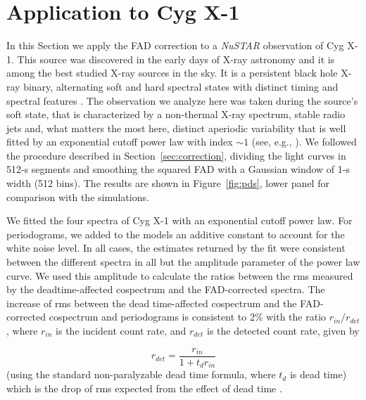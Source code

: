 \documentclass[twocolumn]{aastex61}
\newcommand{\project}[1]{\textsl{#1}}
\newcommand{\nustar}{\project{NuSTAR}\xspace}
\newcommand{\sref}{Section~\ref}
\newcommand{\deadt}{\ensuremath{t_d}\xspace}
\begin{document}
\section{Application to Cyg X-1}\label{sec:realdata}
In this Section we apply the FAD correction to a \nustar observation of Cyg X-1.
This source was discovered in the early days of X-ray astronomy \citep{Bowyer+65} and it is among the best studied X-ray sources in the sky.
It is a persistent black hole X-ray binary, alternating soft and hard spectral states with distinct timing and spectral features \citep[see, e.g., ][]{Grinberg+13}.
The observation we analyze here was taken during the source's soft state, that is characterized by a non-thermal X-ray spectrum, stable radio jets and, what matters the most here, distinct aperiodic variability that is well fitted by an exponential cutoff power law with index $\sim1$ (see, e.g., \citealt{Gilfanov+00}).
We followed the procedure described in \sref{sec:correction}, dividing the light curves in 512-s segments and smoothing the squared FAD with a Gaussian window of 1-s width (512 bins).
The results are shown in Figure~\ref{fig:pds}, lower panel for comparison with the simulations. 

We fitted the four spectra of Cyg X-1 with an exponential cutoff power law. 
For periodograms, we added to the models an additive constant to account for the white noise level.
In all cases, the estimates returned by the fit were consistent between the different spectra in all but the amplitude parameter of the power law curve.
We used this amplitude to calculate the ratios between the rms measured by the deadtime-affected cospectrum and the FAD-corrected spectra.
The increase of rms between the dead time-affected cospectrum and the FAD-corrected cospectrum and periodograms is consistent to 2\% with the ratio $r_{in}/r_{det}$, where $r_{in}$ is the incident count rate, and $r_{det}$ is the detected count rate,
given by

\begin{equation}
r_{det} = \frac{r_{in}}{1 + \deadt r_{in}}
\end{equation} 
(using the standard non-paralyzable dead time formula, where \deadt is dead time) which is the drop of rms expected from the effect of dead time \citep{Bachetti+15}.
\end{document}
